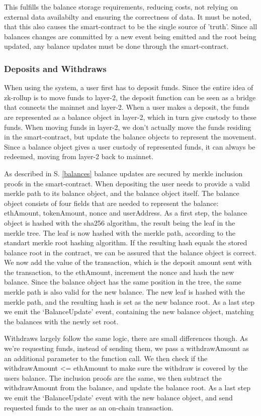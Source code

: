 \documentclass[../../thesis.tex]{subfiles}
\begin{document}
This fulfills the balance storage requirements, reducing costs, not relying on external data availabilty and ensuring the correctness of data. It must be noted, that this also causes the smart-contract to be the single source of 'truth'. Since all balances changes are committed by a new event being emitted and the root being updated, any balance updates must be done through the smart-contract. 

\subsubsection{Deposits and Withdraws}
When using the system, a user first has to deposit funds. Since the entire idea of zk-rollup is to move funds to layer-2, the deposit function can be seen as a bridge that connects the mainnet and layer-2. When a user makes a deposit, the funds are represented as a balance object in layer-2, which in turn give custody to these funds. When moving funds in layer-2, we don't actually move the funds residing in the smart-contract, but update the balance objects to represent the movement. Since a balance object gives a user custody of represented funds, it can always be redeemed, moving from layer-2 back to mainnet.  

As described in S. \ref{balances} balance updates are secured by merkle inclusion proofs in the smart-contract. When depositing the user needs to provide a valid merkle path to its balance object, and the balance object itself. The balance object consists of four fields that are needed to represent the balance: ethAmount, tokenAmount, nonce and userAddress. As a first step, the balance object is hashed with the sha256 algorithm, the result being the leaf in the merkle tree. The leaf is now hashed with the merkle path, according to the standart merkle root hashing algorithm. If the resulting hash equals the stored balance root in the contract, we can be assured that the balance object is correct. We now add the value of the transaction, which is the deposit amount sent with the transaction, to the ethAmount, increment the nonce and hash the new balance. Since the balance object has the same position in the tree, the same merkle path is also valid for the new balance. The new leaf is hashed with the merkle path, and the resulting hash is set as the new balance root. As a last step we emit the `BalanceUpdate' event, containing the new balance object, matching the balances with the newly set root. 

Withdraws largely follow the same logic, there are small differences though. As we're requesting funds, instead of sending them, we pass a withdrawAmount as an additional parameter to the function call. We then check if the withdrawAmount <= ethAmount to make sure the withdraw is covered by the users balance. The inclusion proofs are the same, we then subtract the withdrawAmount from the balance, and update the balance root. As a last step we emit the `BalanceUpdate' event with the new balance object, and send requested funds to the user as an on-chain transaction.
\end{document}
